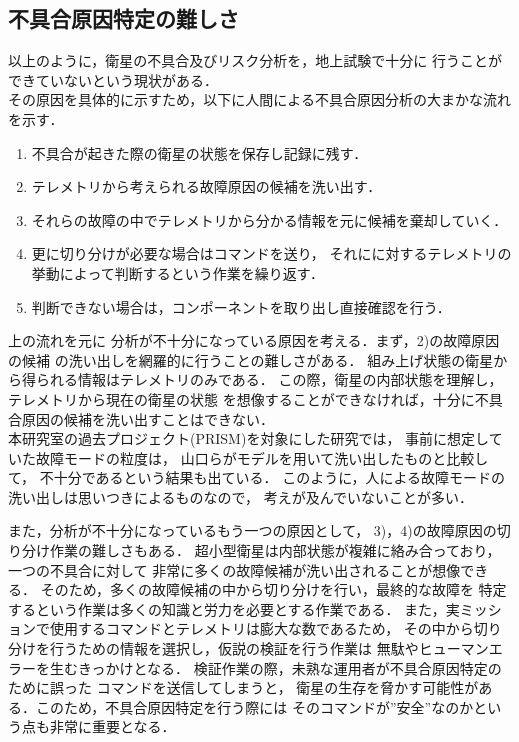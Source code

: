 \documentclass[11pt]{report}
\begin{document}
\subsection{不具合原因特定の難しさ}
以上のように，衛星の不具合及びリスク分析を，地上試験で十分に
行うことができていないという現状がある．\\
その原因を具体的に示すため，以下に人間による不具合原因分析の大まかな流れを示す．
\begin{enumerate}[1)]
   \item 不具合が起きた際の衛星の状態を保存し記録に残す． 
   \item テレメトリから考えられる故障原因の候補を洗い出す．
   \item それらの故障の中でテレメトリから分かる情報を元に候補を棄却していく．
   \item 更に切り分けが必要な場合はコマンドを送り，
   それにに対するテレメトリの挙動によって判断するという作業を繰り返す．
   \item 判断できない場合は，コンポーネントを取り出し直接確認を行う．
\end{enumerate}
上の流れを元に
分析が不十分になっている原因を考える．まず，2)の故障原因の候補
の洗い出しを網羅的に行うことの難しさがある．
組み上げ状態の衛星から得られる情報はテレメトリのみである．
この際，衛星の内部状態を理解し，テレメトリから現在の衛星の状態
を想像することができなければ，十分に不具合原因の候補を洗い出すことはできない．\\
本研究室の過去プロジェクト(PRISM)を対象にした研究では，
事前に想定していた故障モードの粒度は，
山口ら\cite{Yamaguchi2014}がモデルを用いて洗い出したものと比較して，
不十分であるという結果も出ている．
このように，人による故障モードの洗い出しは思いつきによるものなので，
考えが及んでいないことが多い．

また，分析が不十分になっているもう一つの原因として，
3)，4)の故障原因の切り分け作業の難しさもある．
超小型衛星は内部状態が複雑に絡み合っており，一つの不具合に対して
非常に多くの故障候補が洗い出されることが想像できる．
そのため，多くの故障候補の中から切り分けを行い，最終的な故障を
特定するという作業は多くの知識と労力を必要とする作業である．
また，実ミッションで使用するコマンドとテレメトリは膨大な数であるため，
その中から切り分けを行うための情報を選択し，仮説の検証を行う作業は
無駄やヒューマンエラーを生むきっかけとなる．
検証作業の際，未熟な運用者が不具合原因特定のために誤った%
コマンドを送信してしまうと，
衛星の生存を脅かす可能性がある．このため，不具合原因特定を行う際には
そのコマンドが”安全”なのかという点も非常に重要となる．
\end{document}
